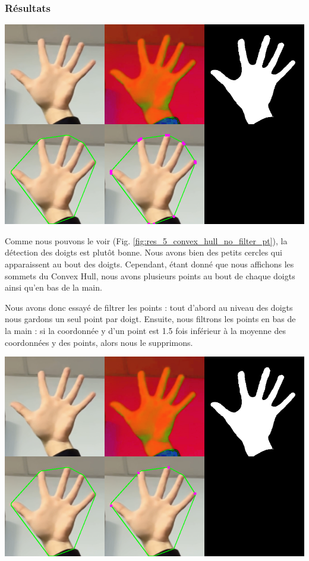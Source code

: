 \documentclass[11pt]{article}
\begin{document}
\subsubsection{Résultats}

\begin{center}
    \includegraphics[width=\textwidth]{images/res_5_convex_hull_no_filter_pt.png}
    \label{fig:res_5_convex_hull_no_filter_pt}
\end{center}

Comme nous pouvons le voir (Fig. \ref{fig:res_5_convex_hull_no_filter_pt}), la détection des doigts est plutôt bonne. Nous avons bien des petits cercles qui apparaissent au bout des doigts. Cependant, étant donné que nous affichons les sommets du Convex Hull, nous avons plusieurs points au bout de chaque doigts ainsi qu'en bas de la main. \bigbreak

Nous avons donc essayé de filtrer les points : tout d'abord au niveau des doigts nous gardons un seul point par doigt. Ensuite, nous filtrons les points en bas de la main : si la coordonnée y d'un point est 1.5 fois inférieur à la moyenne des coordonnées y des points, alors nous le supprimons. \bigbreak

\begin{center}
    \includegraphics[width=\textwidth]{images/res_5_convex_hull_filter_1_y.png}
    \label{fig:res_5_convex_hull_filter_1_y}
\end{center}
\end{document}
